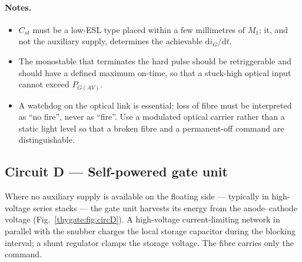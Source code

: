 \paragraph{Notes.}
\begin{itemize}
  \item $C_{st}$ must be a low-ESL type placed within a few millimetres of $M_1$;
        it, and not the auxiliary supply, determines the achievable
        $\mathrm{d}i_G/\mathrm{d}t$.
  \item The monostable that terminates the hard pulse should be retriggerable and
        should have a defined maximum on-time, so that a stuck-high optical input
        cannot exceed $P_{G(AV)}$.
  \item A watchdog on the optical link is essential: loss of fibre must be
        interpreted as ``no fire'', never as ``fire''. Use a modulated optical
        carrier rather than a static light level so that a broken fibre and a
        permanent-off command are distinguishable.
\end{itemize}

\subsection{Circuit D --- Self-powered gate unit}

Where no auxiliary supply is available on the floating side --- typically in
high-voltage series stacks --- the gate unit harvests its energy from the
anode--cathode voltage (Fig.~\ref{thygate:fig:circD}). A high-voltage current-limiting
network in parallel with the snubber charges the local storage capacitor during the
blocking interval; a shunt regulator clamps the storage voltage. The fibre carries
only the command.

